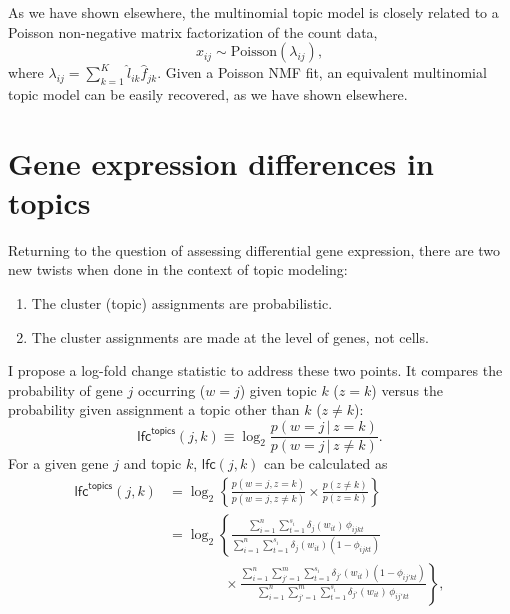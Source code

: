 \documentclass[final]{siamart171218}
\begin{document}
As we have shown elsewhere, the multinomial topic model is closely
related to a Poisson non-negative matrix factorization of the count
data,
\begin{equation}
x_{ij} \sim \mathrm{Poisson}(\lambda_{ij}),
\end{equation}
where $\lambda_{ij} = \sum_{k=1}^K \hat{l}_{ik} \hat{f}_{jk}$. Given a
Poisson NMF fit, an equivalent multinomial topic model can be easily
recovered, as we have shown elsewhere.

\section{Gene expression differences in topics}

Returning to the question of assessing differential gene expression,
there are two new twists when done in the context of topic modeling:
\begin{enumerate}
  
\item The cluster (topic) assignments are probabilistic.

\item The cluster assignments are made at the level of genes, not
  cells.

\end{enumerate}
I propose a log-fold change statistic to address these two points. It
compares the probability of gene $j$ occurring ($w = j$) given topic
$k$ ($z = k$) versus the probability given assignment a topic other
than $k$ ($z \neq k$):
\begin{equation}
\mathsf{lfc}^{\mathsf{topics}}(j,k) \equiv
\log_2 \frac{p(w = j \,|\, z = k)}
            {p(w = j \,|\, z \neq k)}.
\end{equation}
For a given gene $j$ and topic $k$, $\mathsf{lfc}(j,k)$ can be
calculated as
\begin{align}
\mathsf{lfc}^{\mathsf{topics}}(j,k) &=
\log_2 \left\{ \frac{p(w = j, z = k)}
                    {p(w = j, z \neq k)} \times
               \frac{p(z \neq k)}{p(z = k)} \right\} \nonumber \\
&= \log_2 \left\{ 
\frac{\sum_{i=1}^n \sum_{t=1}^{s_i} \delta_j(w_{it}) \, \phi_{ijkt}}
     {\sum_{i=1}^n \sum_{t=1}^{s_i} \delta_j(w_{it}) (1 - \phi_{ijkt})}
\right. \nonumber \\ 
& \qquad \qquad \times \left. \frac{\sum_{i=1}^n \sum_{j'=1}^m \sum_{t=1}^{s_i} 
             \delta_{j'}(w_{it}) (1-\phi_{ij'kt})}
            {\sum_{i=1}^n \sum_{j'=1}^m \sum_{t=1}^{s_i} \delta_{j'}(w_{it}) 
             \, \phi_{ij'kt}} \right\},
\label{eq:lfc-topic}
\end{align}
\end{document}
